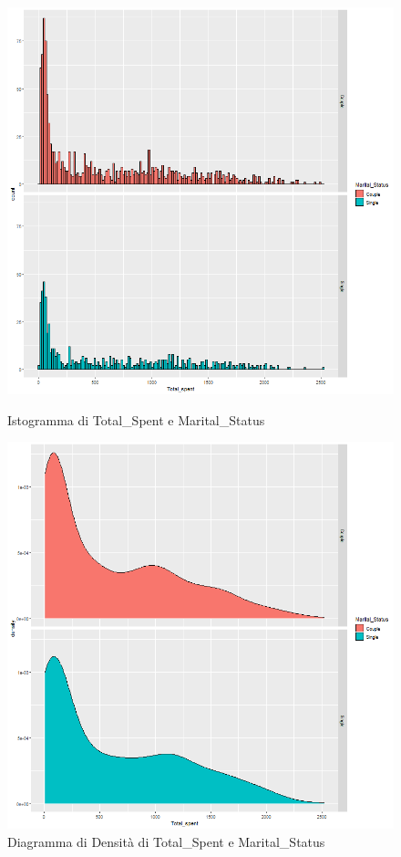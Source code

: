 \documentclass[letterpaper,11pt]{article}
\begin{document}
\begin{figure}[h]
  \centering
  \begin{minipage}[b]{0.4\textwidth}
    \includegraphics[width=\textwidth]{Img/EDA/EDA028.png}
    \caption{Istogramma di Total\_Spent e Marital\_Status}
    \label{fig:IstogrammaTsMaritalStatus}
  \end{minipage}
  \hfill
  \begin{minipage}[b]{0.4\textwidth}
    \includegraphics[width=\textwidth]{Img/EDA/EDA029.png}
    \caption{Diagramma di Densità di Total\_Spent e Marital\_Status }
     \label{fig:DensitaTsMaritalStatus}
  \end{minipage}
\end{figure}
\end{document}
